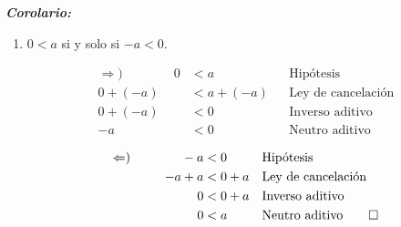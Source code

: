 \documentclass[11pt]{article}
\newcommand{\bfit}[1]{\textbf{\textit{#1}}}
\begin{document}
\begin{enumerate}[label=\alph*)]
    \bfit{Corolario:}
    \begin{enumerate}[label=\roman*)]
        \item $0<a$ si y solo si $-a<0$.
        \begin{center}\vspace{-1em}
            \begin{minipage}[l]{.5\linewidth}
                \begin{align*}
                    \Rightarrow) \qquad \qquad
                    0 &< a && \text{Hipótesis}\\
                    0 + (-a) &< a + (-a) && \text{Ley de cancelación}\\
                    0 + (-a) &< 0 && \text{Inverso aditivo}\\
                    -a &< 0 && \text{Neutro aditivo}
                \end{align*}
        \end{minipage}%
        \begin{minipage}[r]{.5\linewidth}
            \begin{align*}
                \Leftarrow) \qquad \qquad
                -a &< 0 && \text{Hipótesis}\\
                -a + a &< 0 + a && \text{Ley de cancelación}\\
                0 &< 0 + a && \text{Inverso aditivo}\\
                0 &< a && \text{Neutro aditivo} \qedhere
            \end{align*}
        \end{minipage}
        \end{center}


\end{enumerate}
\end{enumerate}
\end{document}
